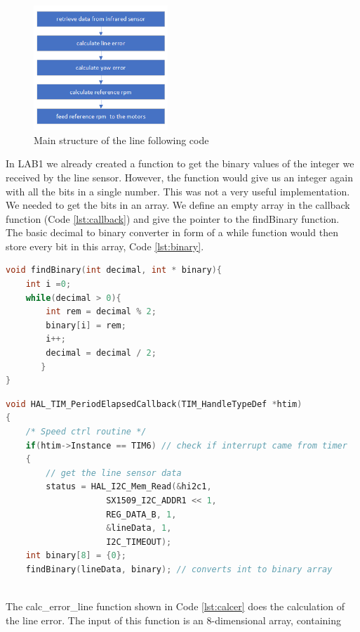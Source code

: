 \documentclass[english]{article}
\begin{document}
\begin{figure}[!h]
    \centering
    \includegraphics[width=0.45\textwidth, height=0.25\textheight]{figures/procedure.png}
    \caption{Main structure of the line following code}
    \label{fig:pro}
\end{figure}
In LAB1 we already created a function to get the binary values of the integer we
 received by the line sensor. However, the function would give us an integer again
  with all the bits in a single number. This was not a very useful implementation.
  We needed to get the bits in an array. We define an empty array in the callback
 function (Code \ref{lst:callback}) and give the pointer to the findBinary function. The basic
 decimal to binary converter in form of a while function would then store every bit in
  this array, Code \ref{lst:binary}.
\begin{lstlisting}[language=C, caption={converts integer to a binary array}, label={lst:binary} ]
void findBinary(int decimal, int * binary){
    int i =0;
    while(decimal > 0){
        int rem = decimal % 2;
        binary[i] = rem;
        i++;
        decimal = decimal / 2;
       }
}
\end{lstlisting}
\begin{lstlisting}[language=C, caption={Top part of the timer callback function }, label={lst:callback} ]
    void HAL_TIM_PeriodElapsedCallback(TIM_HandleTypeDef *htim)
{
	/* Speed ctrl routine */
	if(htim->Instance == TIM6) // check if interrupt came from timer
	{
		// get the line sensor data
		status = HAL_I2C_Mem_Read(&hi2c1,
                    SX1509_I2C_ADDR1 << 1,
                    REG_DATA_B, 1,
                    &lineData, 1,
                    I2C_TIMEOUT);
    int binary[8] = {0};
    findBinary(lineData, binary); // converts int to binary array
    
\end{lstlisting}
The calc\_error\_line function shown in Code \ref{lst:calcer} does the calculation of the 
line error. The input of this function is an 8-dimensional array, containing
\end{document}
